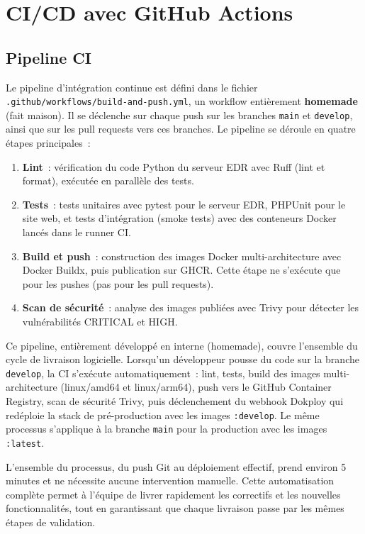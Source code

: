 \section{CI/CD avec GitHub Actions}

\subsection{Pipeline CI}

Le pipeline d'intégration continue est défini dans le fichier
\texttt{.github/workflows/build-and-push.yml}, un workflow entièrement
\textbf{homemade} (fait maison). Il se déclenche sur chaque push sur les
branches \texttt{main} et \texttt{develop}, ainsi que sur les pull requests
vers ces branches. Le pipeline se déroule en quatre étapes principales~:

\begin{enumerate}
  \item \textbf{Lint}~: vérification du code Python du serveur EDR avec Ruff
    (lint et format), exécutée en parallèle des tests.
  \item \textbf{Tests}~: tests unitaires avec pytest pour le serveur EDR,
    PHPUnit pour le site web, et tests d'intégration (smoke tests) avec des
    conteneurs Docker lancés dans le runner CI.
  \item \textbf{Build et push}~: construction des images Docker multi-architecture
    avec Docker Buildx, puis publication sur GHCR. Cette étape ne s'exécute
    que pour les pushes (pas pour les pull requests).
  \item \textbf{Scan de sécurité}~: analyse des images publiées avec Trivy
    pour détecter les vulnérabilités CRITICAL et HIGH.
\end{enumerate}

Ce pipeline, entièrement développé en interne (homemade), couvre l'ensemble du cycle de livraison logicielle. Lorsqu'un développeur pousse du code sur la branche \texttt{develop}, la CI s'exécute automatiquement~: lint, tests, build des images multi-architecture (linux/amd64 et linux/arm64), push vers le GitHub Container Registry, scan de sécurité Trivy, puis déclenchement du webhook Dokploy qui redéploie la stack de pré-production avec les images \texttt{:develop}. Le même processus s'applique à la branche \texttt{main} pour la production avec les images \texttt{:latest}.

L'ensemble du processus, du push Git au déploiement effectif, prend environ 5 minutes et ne nécessite aucune intervention manuelle. Cette automatisation complète permet à l'équipe de livrer rapidement les correctifs et les nouvelles fonctionnalités, tout en garantissant que chaque livraison passe par les mêmes étapes de validation.

